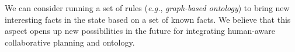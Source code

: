 We can consider running a set of rules (\textit{e.g.}, \textit{graph-based ontology}) to bring new interesting facts in the state based on a set of known facts. We believe that this aspect opens up new possibilities in the future for integrating human-aware collaborative planning and ontology.








